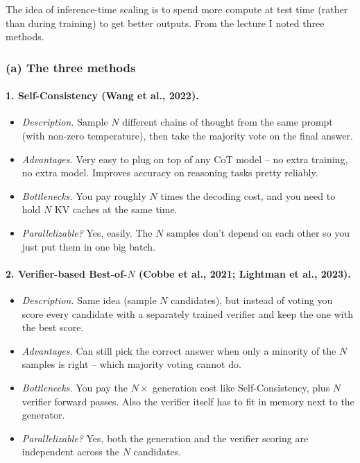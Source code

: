 \documentclass[11pt]{article}
\begin{document}
The idea of inference-time scaling is to spend more compute at test time (rather than during training) to get better outputs. From the lecture I noted three methods.

\subsubsection*{(a) The three methods}

\paragraph{1. Self-Consistency (Wang et al., 2022).}
\begin{itemize}[leftmargin=*]
    \item \emph{Description.} Sample $N$ different chains of thought from the same prompt (with non-zero temperature), then take the majority vote on the final answer.
    \item \emph{Advantages.} Very easy to plug on top of any CoT model -- no extra training, no extra model. Improves accuracy on reasoning tasks pretty reliably.
    \item \emph{Bottlenecks.} You pay roughly $N$ times the decoding cost, and you need to hold $N$ KV caches at the same time.
    \item \emph{Parallelizable?} Yes, easily. The $N$ samples don't depend on each other so you just put them in one big batch.
\end{itemize}

\paragraph{2. Verifier-based Best-of-$N$ (Cobbe et al., 2021; Lightman et al., 2023).}
\begin{itemize}[leftmargin=*]
    \item \emph{Description.} Same idea (sample $N$ candidates), but instead of voting you score every candidate with a separately trained verifier and keep the one with the best score.
    \item \emph{Advantages.} Can still pick the correct answer when only a minority of the $N$ samples is right -- which majority voting cannot do.
    \item \emph{Bottlenecks.} You pay the $N \times$ generation cost like Self-Consistency, plus $N$ verifier forward passes. Also the verifier itself has to fit in memory next to the generator.
    \item \emph{Parallelizable?} Yes, both the generation and the verifier scoring are independent across the $N$ candidates.
\end{itemize}
\end{document}
